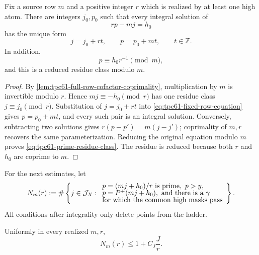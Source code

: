 \begin{proposition}
\label{prop:tpc61-exact-cofactor-ladder}
Fix a source row \(m\) and a positive integer \(r\) which is realized by
at least one high atom.  There are integers \(j_0,p_0\) such that every
integral solution of
\begin{equation}
 rp-mj=h_0
 \label{eq:tpc61-fixed-row-equation}
\end{equation}
has the unique form
\begin{equation}
 \boxed{
 j=j_0+rt,
 \qquad
 p=p_0+mt,
 \qquad t\in\mathbb Z.}
 \label{eq:tpc61-row-cofactor-ladder}
\end{equation}
In addition,
\begin{equation}
 p\equiv h_0r^{-1}\pmod m,
 \label{eq:tpc61-prime-residue-class}
\end{equation}
and this is a reduced residue class modulo \(m\).
\end{proposition}

\begin{proof}
By \cref{lem:tpc61-full-row-cofactor-coprimality}, multiplication by
\(m\) is invertible modulo \(r\).  Hence
\(mj\equiv-h_0\pmod r\) has one residue class
\(j\equiv j_0\pmod r\).  Substitution of \(j=j_0+rt\) into
\eqref{eq:tpc61-fixed-row-equation} gives
\(p=p_0+mt\), and every such pair is an integral solution.  Conversely,
subtracting two solutions gives \(r(p-p')=m(j-j')\); coprimality of
\(m,r\) recovers the same parameterization.  Reducing the original
equation modulo \(m\) proves \eqref{eq:tpc61-prime-residue-class}.
The residue is reduced because both \(r\) and \(h_0\) are coprime to
\(m\).
\end{proof}

For the next estimates, let
\begin{equation}
 N_m(r)
 :=\#\left\{j\in\mathcal J_X:
 \begin{array}{l}
 p=(mj+h_0)/r\text{ is prime},\ p>y,\\[-2pt]
 p=P^{+}(mj+h_0),\text{ and there is a }\gamma\\[-2pt]
 \text{for which the common high masks pass}
 \end{array}\right\}.
 \label{eq:tpc61-Nmr}
\end{equation}
All conditions after integrality only delete points from the ladder.

\begin{corollary}
\label{cor:tpc61-deterministic-row-capacity}
Uniformly in every realized \(m,r\),
\begin{equation}
 \boxed{
 N_m(r)\le 1+C_J\frac Jr.}
 \label{eq:tpc61-trivial-row-capacity}
\end{equation}
\end{corollary}

